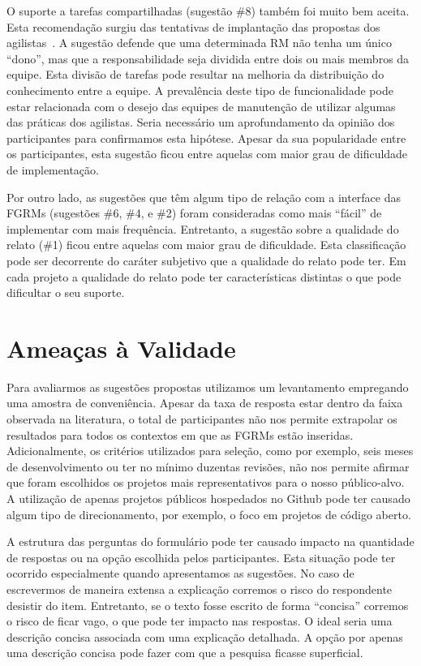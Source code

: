 O suporte a tarefas compartilhadas (sugestão \#8) também foi muito bem aceita.
Esta recomendação surgiu das tentativas de implantação das propostas dos
agilistas~\cite{svensson2005introducing}. A sugestão defende que uma
determinada RM não tenha um único ``dono'', mas que a responsabilidade seja
dividida entre dois ou mais membros da equipe. Esta divisão de tarefas pode
resultar na melhoria da distribuição do conhecimento entre a equipe. A
prevalência deste tipo de funcionalidade pode estar relacionada com o desejo
das equipes de manutenção de utilizar algumas das práticas dos agilistas. Seria
necessário um aprofundamento da opinião dos participantes para confirmamos esta
hipótese. Apesar da sua popularidade entre os participantes, esta sugestão
ficou entre aquelas com maior grau de dificuldade de implementação.

Por outro lado, as sugestões que têm algum tipo de relação com a interface das
FGRMs (sugestões \#6, \#4, e \#2) foram consideradas como mais ``fácil'' de
implementar com mais frequência. Entretanto, a sugestão sobre a qualidade do
relato (\#1) ficou entre aquelas com maior grau de dificuldade. Esta
classificação pode ser decorrente do caráter subjetivo que a qualidade do
relato pode ter. Em cada projeto a qualidade do relato pode ter características
distintas o que pode dificultar o seu suporte.

\section{Ameaças à Validade}
\label{sec:sug_melhoria_ameacas}

Para avaliarmos as sugestões propostas utilizamos um levantamento empregando
uma amostra de conveniência. Apesar da taxa de resposta estar dentro da faixa
observada na literatura, o total de participantes não nos permite extrapolar os
resultados para todos os contextos em que as FGRMs estão inseridas.
Adicionalmente, os critérios utilizados para seleção, como por exemplo, seis
meses de desenvolvimento ou ter no mínimo duzentas revisões, não nos permite
afirmar que foram escolhidos os projetos mais representativos para o nosso
público-alvo. A utilização de apenas projetos públicos hospedados no Github
pode ter causado algum tipo de direcionamento, por exemplo, o foco em
projetos de código aberto.

A estrutura das perguntas do formulário pode ter causado impacto na quantidade
de respostas ou na opção escolhida pelos participantes. Esta situação pode ter
ocorrido especialmente quando apresentamos as sugestões. No caso de escrevermos
de maneira extensa a explicação corremos o risco do respondente desistir do
item. Entretanto, se o texto fosse escrito de forma ``concisa'' corremos o
risco de ficar vago, o que pode ter impacto nas respostas. O ideal seria uma
descrição concisa associada com uma explicação detalhada. A opção por apenas
uma descrição concisa pode fazer com que a pesquisa ficasse superficial.

